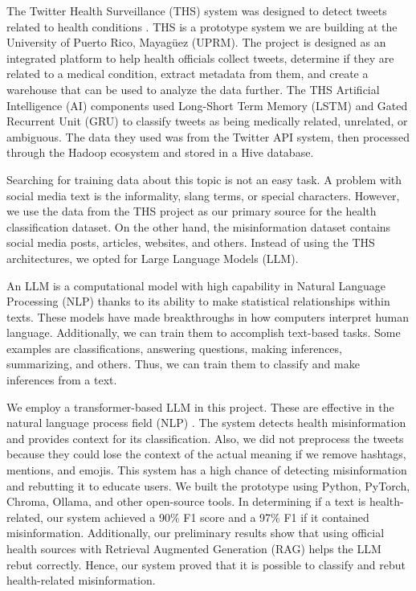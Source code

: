 The Twitter Health Surveillance (THS) system was designed to detect tweets related to health conditions \cite{8622504}. THS is a prototype system we are building at the University
of Puerto Rico, Mayag\"uez (UPRM). The project is designed as an integrated platform to help health officials collect tweets, determine if they are related to a medical condition, extract
metadata from them, and create a warehouse that can be used to analyze the data further. The THS Artificial Intelligence (AI) components used Long-Short Term Memory (LSTM)
and Gated Recurrent Unit (GRU) to classify tweets as being medically related, unrelated, or ambiguous. The data they used was from the Twitter API system, then processed
through the Hadoop ecosystem and stored in a Hive database.

Searching for training data about this topic is not an easy task. A problem with social media text is the informality, slang terms, or special characters. However, we use the
data from the THS project as our primary source for the health classification dataset. On the other hand, the misinformation dataset contains social media posts, articles,
websites, and others. Instead of using the THS architectures, we opted for Large Language Models (LLM). 

An LLM is a computational model with high capability in Natural Language Processing (NLP) thanks to its ability to make statistical relationships within texts. These models
have made breakthroughs in how computers interpret human language. Additionally, we can train them to accomplish text-based tasks. Some examples are classifications,
answering questions, making inferences, summarizing, and others. Thus, we can train them to classify and make inferences from a text.

We employ a transformer-based LLM in this project. These are effective in the natural language process field (NLP) \cite{DBLP:journals/corr/abs-2105-00813}.
The system detects health misinformation and provides context for its classification. Also, we did not preprocess the tweets because they could lose the context of the actual meaning if we
remove hashtags, mentions, and emojis. This system has a high chance of detecting misinformation and rebutting it to educate users. We built the prototype using Python, PyTorch, Chroma,
Ollama, and other open-source tools. In determining if a text is health-related, our system achieved a 90\% F1 score and a 97\% F1 if it contained misinformation. Additionally, our preliminary
results show that using official health sources with Retrieval Augmented Generation (RAG) helps the LLM rebut correctly. Hence, our system proved that it is possible to classify and rebut health-related misinformation.


